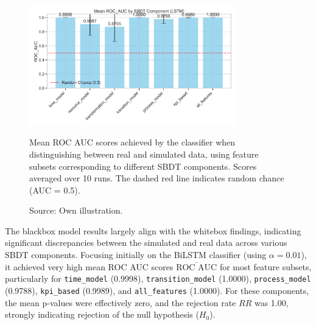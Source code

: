 \begin{figure}[htbp]
  \centering
  \includegraphics[width=0.8\textwidth]{figures/lstm-roc-auc-by-component.png}
  \caption[Results Blackbox model]{Mean ROC AUC scores achieved by the classifier when distinguishing between real and simulated data, using feature subsets corresponding to different SBDT components. Scores averaged over 10 runs. The dashed red line indicates random chance (AUC = 0.5).}
  \label{fig:bilstm-roc-auc}
  \caption*{Source: Own illustration.}
\end{figure}

The blackbox model results largely align with the whitebox findings, indicating significant discrepancies between the simulated and real data across various SBDT components. Focusing initially on the BiLSTM classifier (using $\alpha = 0.01$), it achieved very high mean ROC AUC scores $\overline{\text{ROC AUC}}$ for most feature subsets, particularly for \texttt{time\_model} (0.9998), \texttt{transition\_model} (1.0000), \texttt{process\_model} (0.9788), \texttt{kpi\_based} (0.9989), and \texttt{all\_features} (1.0000). For these components, the mean p-values were effectively zero, and the rejection rate $RR$ was 1.00, strongly indicating rejection of the null hypothesis ($H_0$).

